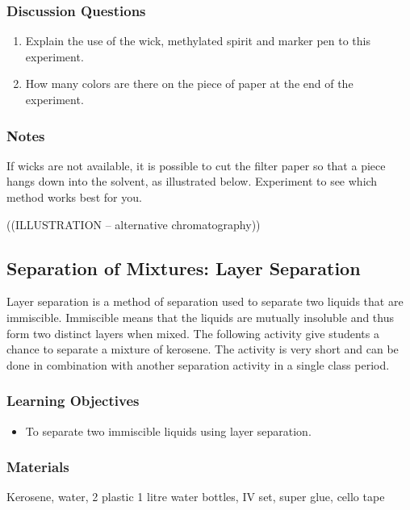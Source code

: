 \subsubsection*{Discussion Questions}
\begin{enumerate}
\item{Explain the use of the wick, methylated spirit and marker pen to this experiment.}
\item{How many colors are there on the piece of paper at the end of the experiment.}
\end{enumerate}

\subsubsection*{Notes}
If wicks are not available, it is possible to cut the filter paper so that a piece hangs down into the solvent, as illustrated below. Experiment to see which method works best for you.

((ILLUSTRATION -- alternative chromatography))

\subsection{Separation of Mixtures: Layer Separation}
Layer separation is a method of separation used to separate two liquids that are immiscible. Immiscible means that the liquids are mutually insoluble and thus form two distinct layers when mixed. The following activity give students a chance to separate a mixture of kerosene. The activity is very short and can be done in combination with another separation activity in a single class period.

\subsubsection*{Learning Objectives}
\begin{itemize}
\item{To separate two immiscible liquids using layer separation.}
\end{itemize}

\subsubsection*{Materials}
Kerosene, water, 2 plastic 1 litre water bottles, IV set, super glue, cello tape

